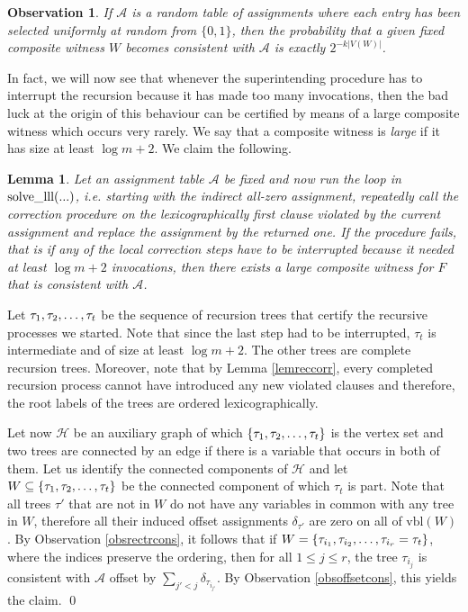 \documentclass[11pt,a4paper]{article}
\newtheorem{lemma}[theorem]{Lemma}
\newtheorem{observation}[theorem]{Observation}
\newcommand{\prbl}{\vspace*{0.2cm}}
\newcommand{\Function}[2]
	{ \mbox{\rm #1}(#2)}
\begin{document}
\begin{observation}
\label{obssmallprob}
If $\mathcal{A}$ is a random table of assignments where each entry has been selected uniformly at random from $\{0,1\}$, 
then the probability that a given fixed composite witness $W$ becomes consistent with $\mathcal{A}$ is exactly 
$2^{-k|V(W)|}$. 
\end{observation}
\prbl

In fact, we will now see that whenever the superintending procedure has to interrupt the recursion because it
has made too many invocations, then the bad luck at the origin of this behaviour can be certified by means of a 
large composite witness which occurs very rarely. We say that a composite witness is \emph{large} if it has 
size at least $\log m + 2$. We claim the following.

\begin{lemma}
Let an assignment table $\mathcal{A}$ be fixed and now run the loop in $\Function{solve\_lll}{...}$, i.e. starting
with the indirect all-zero assignment, repeatedly call the correction procedure on the lexicographically first clause 
violated by the current assignment and replace the assignment by the returned one. If the procedure fails, that is
if any of the local correction steps have to be interrupted because it needed at least $\log m + 2$ invocations, then
there exists a large composite witness for $F$ that is consistent with $\mathcal{A}$.
\end{lemma}

\proof Let $\tau_1, \tau_2, \mathellipsis, \tau_t$ be the sequence of recursion trees that certify the recursive
processes we started. Note that since the last step had to be interrupted, $\tau_t$ is intermediate and of size
at least $\log m + 2$. The other trees are complete recursion trees. Moreover, note that by Lemma \ref{lemreccorr},
every completed recursion process cannot have introduced any new violated clauses and therefore, the root labels
of the trees are ordered lexicographically.

Let now $\mathcal{H}$ be an auxiliary graph of which $\{\tau_1, \tau_2, \mathellipsis, \tau_t\}$ is the vertex
set and two trees are connected by an edge if there is a variable that occurs in both of them. Let us identify the
connected components of $\mathcal{H}$ and let $W \subseteq \{\tau_1, \tau_2, \mathellipsis, \tau_t\}$ be the connected
component of which $\tau_t$ is part. Note that all trees $\tau'$ that are not in $W$ do not have any variables in
common with any tree in $W$, therefore all their induced offset assignments $\delta_{\tau'}$ are zero on all 
of $\mbox{vbl}(W)$. By Observation \ref{obsrectrcons}, it follows that if $W = \{\tau_{i_1}, \tau_{i_2}, \mathellipsis, \tau_{i_r}=\tau_t\}$,
where the indices preserve the ordering, then for all $1 \le j \le r$, the tree $\tau_{i_j}$ is consistent
with $\mathcal{A}$ offset by $\sum_{j'<j} \delta_{\tau_{i_{j'}}}$. By Observation \ref{obsoffsetcons}, this yields the claim. \qed
\end{document}
